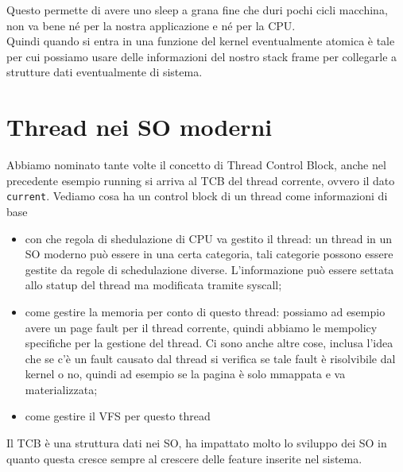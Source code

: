 \documentclass[12pt, oneside]{extbook}
\begin{document}
Questo permette di avere uno sleep a grana fine che duri pochi cicli macchina, non va bene né per la nostra applicazione e né per la CPU.\\Quindi quando si entra in una funzione del kernel eventualmente atomica è tale per cui possiamo usare delle informazioni del nostro stack frame per collegarle a strutture dati eventualmente di sistema.
\section{Thread nei SO moderni}
Abbiamo nominato tante volte il concetto di Thread Control Block, anche nel precedente esempio running si arriva al TCB del thread corrente, ovvero il dato \texttt{current}. Vediamo cosa ha un control block di un thread come informazioni di base
\begin{itemize}
\item con che regola di shedulazione di CPU va gestito il thread: un thread in un SO moderno può essere in una certa categoria, tali categorie possono essere gestite da regole di schedulazione diverse. L'informazione può essere settata allo statup del thread ma modificata tramite syscall;
\item come gestire la memoria per conto di questo thread: possiamo ad esempio avere un page fault per il thread corrente, quindi abbiamo le mempolicy specifiche per la gestione del thread. Ci sono anche altre cose, inclusa l'idea che se c'è un fault causato dal thread si verifica se tale fault è risolvibile dal kernel o no, quindi ad esempio se la pagina è solo mmappata e va materializzata;
\item come gestire il VFS per questo thread
\end{itemize}
Il TCB è una struttura dati nei SO, ha impattato molto lo sviluppo dei SO in quanto questa cresce sempre al crescere delle feature inserite nel sistema.
\end{document}
